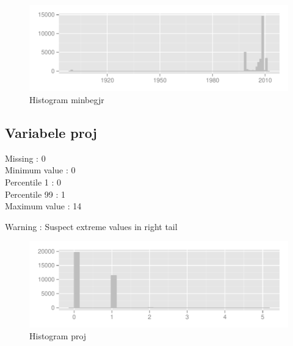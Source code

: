 \documentclass[10pt,a4paper,titlepage]{report}
\begin{document}
\color{black}

\begin{figure}[H]
   \centering
\begin{knitrout}
\color{fgcolor}\begin{kframe}


{\ttfamily\noindent\color{warningcolor}{\#\# Warning: position\_stack requires constant width: output may be incorrect}}\end{kframe}
\includegraphics[width=\maxwidth]{figure/unnamed-chunk-4} 

\end{knitrout}

    \caption{Histogram minbegjr}
    \label{fig:figPlot2}
\end{figure}


\subsection{Variabele proj}

Missing :  0 \\
Minimum value : 0\\
Percentile 1 : 0\\
Percentile 99 : 1\\
Maximum value : 14

\color{red}
Warning : Suspect extreme values in right tail

\color{black}

\begin{figure}[H]
   \centering
\begin{knitrout}
\color{fgcolor}
\includegraphics[width=\maxwidth]{figure/unnamed-chunk-6} 

\end{knitrout}

    \caption{Histogram proj}
    \label{fig:figPlot3}
\end{figure}
\end{document}
